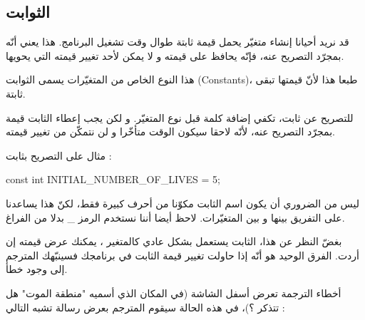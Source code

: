 \subsection{الثوابت}
قد نريد أحيانا إنشاء متغيّر يحمل قيمة ثابتة طوال وقت تشغيل البرنامج. هذا يعني أنّه بمجرّد التصريح عنه، فإنّه يحافظ على قيمته و لا يمكن لأحد تغيير قيمته التي يحويها.

هذا النوع الخاص من المتغيّرات يسمى الثوابت (\textenglish{Constants})، طبعا هذا لأنّ قيمتها تبقى ثابتة.

للتصريح عن ثابت، تكفي إضافة كلمة
قبل نوع المتغيّر. و لكن يجب إعطاء الثابت قيمة بمجرّد التصريح عنه، لأنّه لاحقا سيكون الوقت متأخّرا و لن نتمكّن من تغيير قيمته.

مثال على التصريح بثابت :
\begin{Csource}
const int INITIAL_NUMBER_OF_LIVES = 5;
\end{Csource}
\begin{information}
  ليس من الضروري أن يكون اسم الثابت مكوّنا من أحرف كبيرة فقط، لكنّ هذا يساعدنا على التفريق بينها و بين المتغيّرات. لاحظ أيضا أننا نستخدم الرمز
\_
 بدلا من الفراغ.
\end{information}
بغضّ النظر عن هذا، الثابت يستعمل بشكل عادي كالمتغير ، يمكنك عرض قيمته إن أردت. الفرق الوحيد هو أنّه إذا حاولت تغيير قيمة الثابت في برنامجك فسينبّهك المترجم إلى وجود خطأ.

أخطاء الترجمة تعرض أسفل الشاشة (في المكان الذي أسميه "منطقة الموت" هل تتذكر ؟)، في هذه الحالة سيقوم المترجم بعرض رسالة تشبه التالي :\\
